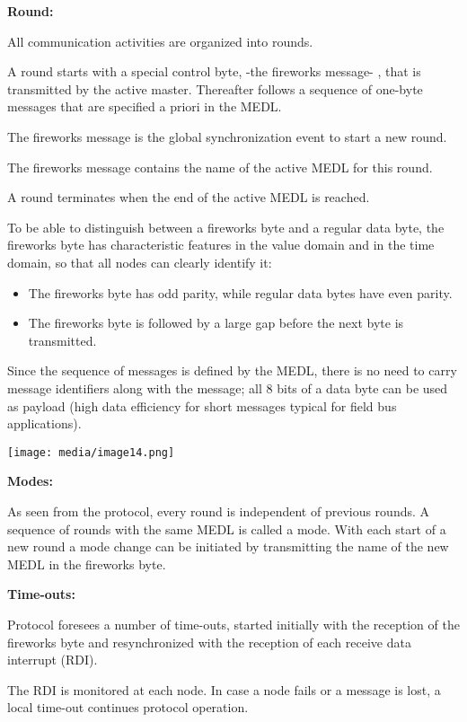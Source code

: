 \textbf{Round:}

All communication activities are organized into rounds.

A round starts with a special control byte, -the fireworks message- ,
that is transmitted by the active master. Thereafter follows a sequence
of one-byte messages that are specified a priori in the MEDL.

The fireworks message is the global synchronization event to start a new
round.

The fireworks message contains the name of the active MEDL for this
round.

A round terminates when the end of the active MEDL is reached.

To be able to distinguish between a fireworks byte and a regular data
byte, the fireworks byte has characteristic features in the value domain
and in the time domain, so that all nodes can clearly identify it:

\begin{itemize}
\item
  The fireworks byte has odd parity, while regular data bytes have even
  parity.
\item
  The fireworks byte is followed by a large gap before the next byte is
  transmitted.
\end{itemize}

Since the sequence of messages is defined by the MEDL, there is no need
to carry message identifiers along with the message; all 8 bits of a
data byte can be used as payload (high data efficiency for short
messages typical for field bus applications).

\texttt{[image: media/image14.png]}

\textbf{Modes:}

As seen from the protocol, every round is independent of previous
rounds. A sequence of rounds with the same MEDL is called a mode. With
each start of a new round a mode change can be initiated by transmitting
the name of the new MEDL in the fireworks byte.

\textbf{Time-outs:}

Protocol foresees a number of time-outs, started initially with the
reception of the fireworks byte and resynchronized with the reception of
each receive data interrupt (RDI).

The RDI is monitored at each node. In case a node fails or a message is
lost, a local time-out continues protocol operation.

